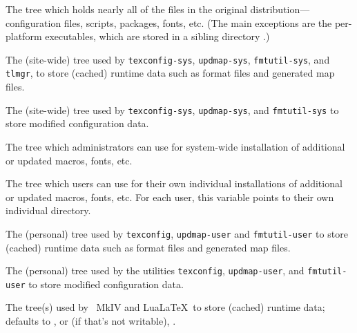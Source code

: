 \documentclass[12pt]{article}
\begin{document}
\begin{ttdescription}
\item [TEXMFDIST] The tree which holds nearly all of the files in the original
  distribution---configuration files, scripts, packages, fonts, etc.
  (The main exceptions are the per-platform executables, which are stored
  in a sibling directory .)
\item [TEXMFSYSVAR] The (site-wide) tree used by \verb+texconfig-sys+,
  \verb+updmap-sys+, \verb+fmtutil-sys+, and \verb+tlmgr+, to store
  (cached) runtime data such as format files and generated map files.
\item [TEXMFSYSCONFIG] The (site-wide) tree used by
  \verb+texconfig-sys+, \verb+updmap-sys+, and \verb+fmtutil-sys+ to
  store modified configuration data.
\item [TEXMFLOCAL] The tree which administrators can use for system-wide
  installation of additional or updated macros, fonts, etc.
\item [TEXMFHOME] The tree which users can use for their own individual
  installations of additional or updated macros, fonts, etc.
  For each user, this variable points to
  their own individual directory.
\item [TEXMFVAR] The (personal) tree used by \verb+texconfig+,
  \verb+updmap-user+ and \verb+fmtutil-user+ to store (cached) runtime data such
  as format files and generated map files.
\item [TEXMFCONFIG] The (personal) tree used by the utilities
  \verb+texconfig+, \verb+updmap-user+, and \verb+fmtutil-user+ to store modified
  configuration data.
\item [TEXMFCACHE] The tree(s) used by \ConTeXt\ MkIV and Lua\LaTeX\
  to store (cached) runtime data; defaults to ,
  or (if that's not writable), \code{TEXMFVAR}.
\end{ttdescription}
\end{document}
